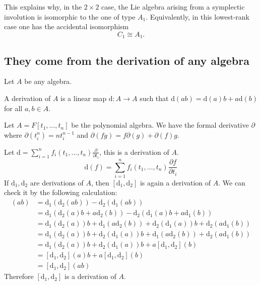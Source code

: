 \documentclass[11pt, a4paper]{report}
\begin{document}
\begin{remark}
    This explains why, in the $2\times 2$ case, the Lie algebra arising from a symplectic involution is isomorphic to the one of type $A_{1}$. Equivalently, in this lowest-rank case one has the accidental isomorphism
    \[
    C_{1}\cong A_{1}.
    \]
\end{remark}

\subsection{They come from the derivation of any algebra}

Let $A$ be any algebra.

\begin{definition}
    A derivation of $A$ is a linear map $\mathrm{d}: A \to A$ such that $\mathrm{d}(ab)=\mathrm{d}(a)b+a\mathrm{d}(b)$ for all $a,b \in A$.
\end{definition}

\begin{example}
    Let $A=F[t_1,\ldots ,t_n]$ be the polynomial algebra. We have the formal derivative $ \partial $ where $\partial(t_i^n)=nt_i^{n-1}$ and $\partial(fg)=f\partial(g)+\partial(f)g$.

    Let $\mathrm{d}=\sum_{i=1}^n f_i(t_1,\ldots ,t_n) \frac{\partial}{\partial t_i} $, this is a derivation of $A$.
    \[
    \mathrm{d}(f)=\sum_{i=1}^n f_i(t_1,\ldots ,t_n) \frac{\partial f}{\partial t_i}
    \]
   If $\mathrm{d}_1,\mathrm{d}_2$ are derivations of $A$, then $[\mathrm{d}_1,\mathrm{d}_2]$ is again a derivation of $A$. We can check it by the following calculation:
   \begin{align*}
   [\mathrm{d}_1,\mathrm{d}_2](ab)&=\mathrm{d}_1(\mathrm{d}_2(ab))-\mathrm{d}_2(\mathrm{d}_1(ab)) \\
   &=\mathrm{d}_1(\mathrm{d}_2(a)b+a\mathrm{d}_2(b))-\mathrm{d}_2(\mathrm{d}_1(a)b+a\mathrm{d}_1(b)) \\
   &=\mathrm{d}_1(\mathrm{d}_2(a))b+\mathrm{d}_1(a\mathrm{d}_2(b))+\mathrm{d}_2(\mathrm{d}_1(a))b+\mathrm{d}_2(a\mathrm{d}_1(b)) \\
   &=\mathrm{d}_1(\mathrm{d}_2(a))b+\mathrm{d}_2(\mathrm{d}_1(a))b+\mathrm{d}_1(a\mathrm{d}_2(b))+\mathrm{d}_2(a\mathrm{d}_1(b)) \\
   &=\mathrm{d}_1(\mathrm{d}_2(a))b+\mathrm{d}_2(\mathrm{d}_1(a))b+a[\mathrm{d}_1,\mathrm{d}_2](b) \\
   &=[\mathrm{d}_1,\mathrm{d}_2](a)b+a[\mathrm{d}_1,\mathrm{d}_2](b) \\
   &=[\mathrm{d}_1,\mathrm{d}_2](ab)
   \end{align*}
   Therefore $[\mathrm{d}_1,\mathrm{d}_2]$ is a derivation of $A$.
\end{example}
\end{document}
